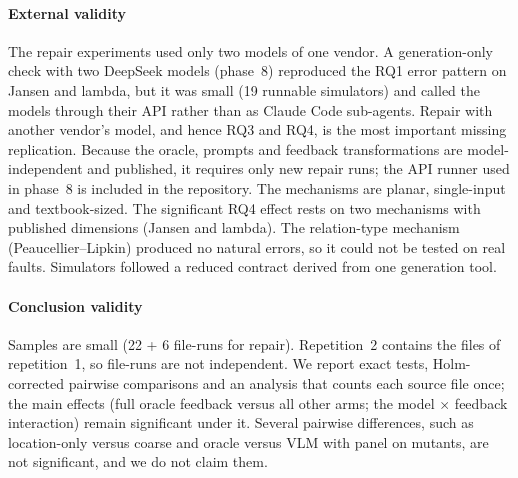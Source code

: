 \paragraph{External validity} The repair experiments used only two models of one vendor. A generation-only check with two DeepSeek models (phase~8) reproduced the RQ1 error pattern on Jansen and lambda, but it was small (19 runnable simulators) and called the models through their API rather than as Claude Code sub-agents. Repair with another vendor's model, and hence RQ3 and RQ4, is the most important missing replication. Because the oracle, prompts and feedback transformations are model-independent and published, it requires only new repair runs; the API runner used in phase~8 is included in the repository. The mechanisms are planar, single-input and textbook-sized. The significant RQ4 effect rests on two mechanisms with published dimensions (Jansen and lambda). The relation-type mechanism (Peaucellier--Lipkin) produced no natural errors, so it could not be tested on real faults. Simulators followed a reduced contract derived from one generation tool.

\paragraph{Conclusion validity} Samples are small (22 + 6 file-runs for repair). Repetition~2 contains the files of repetition~1, so file-runs are not independent. We report exact tests, Holm-corrected pairwise comparisons and an analysis that counts each source file once; the main effects (full oracle feedback versus all other arms; the model $\times$ feedback interaction) remain significant under it. Several pairwise differences, such as location-only versus coarse and oracle versus VLM with panel on mutants, are not significant, and we do not claim them.
